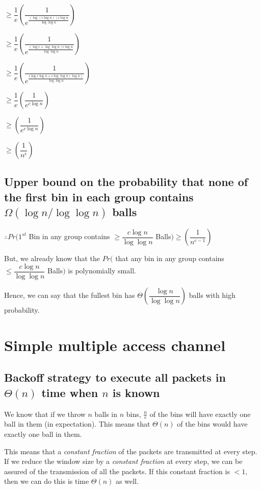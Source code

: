\documentclass{article}
\begin{document}
$\ge \dfrac{1}{e} \left(\dfrac{1}{{e}^{\frac{(\log{(c\log{n})})c\log{n}}{\log{\log{n}}}}} \right)$ 

$\ge \dfrac{1}{e} \left(\dfrac{1}{{e}^{\frac{(\log{c} + \log{\log{n}})c\log{n}}{\log{\log{n}}}}} \right)$

$\ge \dfrac{1}{e} \left(\dfrac{1}{{e}^{\frac{c\log{c}\log{n} + c\log{\log{n}}(\log{n})}{\log{\log{n}}}}} \right)$ 

$\ge \dfrac{1}{e} \left(\dfrac{1}{{e}^{c\log{n}}} \right)$

$\ge \left(\dfrac{1}{{e}^{c\log{n}}} \right)$

$\ge \left(\dfrac{1}{n^{c}} \right)$

\subsection{Upper bound on the probability that none of the first bin in each group contains $\Omega(\log{n}/\log{\log{n}})$ balls}

$\therefore Pr(1^{st}$ Bin in any group contains $\ge \dfrac{c\log{n}}{\log{\log{n}}}$ Balls$) \ge \left(\dfrac{1}{n^{c-1}} \right)$

But, we already know that the $Pr($ that any bin in any group contains $\le \dfrac{c\log{n}}{\log{\log{n}}}$ Balls$)$ is polynomially small.

Hence, we can say that the fullest bin has $\Theta\left(\dfrac{\log{n}}{\log{\log{n}}}\right)$ balls with high probability.

\clearpage

\section {Simple multiple access channel}

\subsection{Backoff strategy to execute all packets in $\Theta(n)$ time when $n$ is \textbf{known}}

We know that if we throw $n$ balls in $n$ bins, $\frac{n}{e}$ of the
bins will have exactly one ball in them (in expectation). This means
that $\Theta(n)$ of the bins would have exactly one ball in them.

This means that a \textit{constant fraction} of the packets are
transmitted at every step. If we reduce the window size by a
\textit{constant fraction} at every step, we can be assured of the
transmission of all the packets. If this constant fraction is $< 1$,
then we can do this is time $\Theta(n)$ as well.
\end{document}
